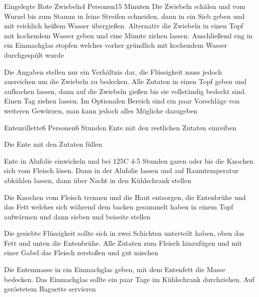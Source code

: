 \begin{recipe}{Eingelegte Rote Zwiebeln}{4 Personen}{15 Minuten}
Die Zwiebeln schälen und vom Wurzel bis zum Stamm in feine Streifen schneiden, dann in ein Sieb geben und mit reichlich heißem Wasser übergießen. Alternativ die Zwiebeln in einen Topf mit kochendem Wasser geben und eine Minute ziehen lassen. Anschließend eng in ein Einmachglas stopfen welches vorher gründlich mit kochendem Wasser durchgespült wurde

\ing[Optional:]{}{}
Die Angaben stellen nur ein Verhältnis dar, die Flüssigkeit muss jedoch ausreichen um die Zwiebeln zu bedecken.
Alle Zutaten in einen Topf geben und aufkochen lassen, dann auf die Zwiebeln gießen bis sie vollständig bedeckt sind. Einen Tag ziehen lassen. Im Optionalen Bereich sind ein paar Vorschläge von weiteren Gewürzen, man kann jedoch alles Mögliche dazugeben
\end{recipe} 


\begin{recipe}{Entenrillette}{6 Personen}{6 Stunden}
Ente mit den restlichen Zutaten einreiben

Die Ente mit den Zutaten füllen
 
\ing[]{}{}
Ente in Alufolie einwickeln und bei 125\0C 4-5 Stunden garen oder bis die Knochen sich vom Fleisch lösen.
Dann in der Alufolie lassen und auf Raumtemperatur abkühlen lassen, dann über Nacht in den Kühlschrank stellen

\ing[]{}{}
Die Knochen vom Fleisch trennen und die Haut entsorgen, die Entenbrühe und das Fett welches sich während dem backen gesammelt haben in einem Topf aufwärmen und dann sieben und beiseite stellen

Die gesiebte Flüssigkeit sollte sich in zwei Schichten unterteilt haben, oben das Fett und unten die Entenbrühe.
Alle Zutaten zum Fleisch hinzufügen und mit einer Gabel das Fleisch zerstoßen und gut mischen

Die Entenmasse in ein Einmachglas geben, mit dem Entenfett die Masse bedecken.
Das Einmachglas sollte ein paar Tage im Kühlschrank durchziehen.
Auf geröstetem Baguette servieren
\end{recipe}

